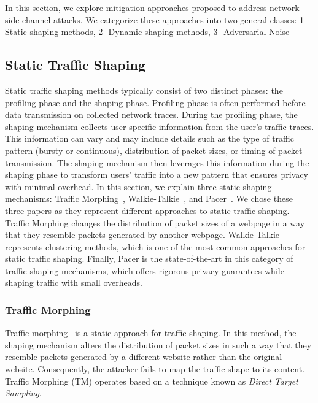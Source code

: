 In this section, we explore mitigation approaches proposed to address network side-channel attacks. 
We categorize these approaches into two general classes: 1- Static shaping methods, 2- Dynamic shaping methods, 3- Adversarial Noise 



\subsection{Static Traffic Shaping}\label{subsec:static-traffic-shaping}
Static traffic shaping methods typically consist of two distinct phases: the profiling phase and the shaping phase.
Profiling phase is often performed before data transmission on collected network traces.  
During the profiling phase, the shaping mechanism collects user-specific information from the user's traffic traces.
This information can vary and may include details such as the type of traffic pattern (\ie bursty or continuous), distribution of packet sizes, or timing of packet transmission.
The shaping mechanism then leverages this information during the shaping phase to transform users' traffic into a new pattern that ensures privacy with minimal overhead.
In this section, we explain three static shaping mechanisms: Traffic Morphing~\cite{wright2009traffic}, Walkie-Talkie~\cite{wang2017walkie}, and Pacer~\cite{mehta2022pacer}.
We chose these three papers as they represent different approaches to static traffic shaping.
Traffic Morphing changes the distribution of packet sizes of a webpage in a way that they resemble packets generated by another webpage.
Walkie-Talkie represents clustering methods, which is one of the most common approaches for static traffic shaping.
Finally, Pacer is the state-of-the-art in this category of traffic shaping mechanisms, which offers rigorous privacy guarantees while shaping traffic with small overheads.   
\subsubsection{Traffic Morphing}\label{subsubsec:traffic-morphing}
Traffic morphing~\cite{wright2009traffic} is a static approach for traffic shaping. 
In this method, the shaping mechanism alters the distribution of packet sizes in such a way that they resemble packets generated by a different website rather than the original website.
Consequently, the attacker fails to map the traffic shape to its content. 
Traffic Morphing (TM) operates based on a technique known as \textit{Direct Target Sampling}.

